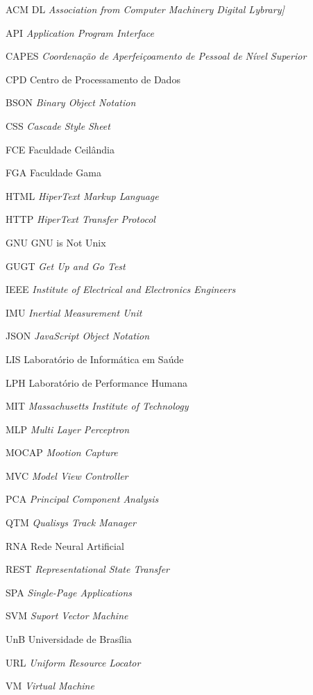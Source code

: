 \begin{siglas}
	\item[ACM DL] \emph{Association from Computer Machinery Digital Lybrary]}
	\item[API] \emph{Application Program Interface}
	\item[CAPES] \emph{Coordenação de Aperfeiçoamento de Pessoal de Nível Superior}
	\item[CPD] Centro de Processamento de Dados
	\item[BSON] \emph{Binary Object Notation} 
	\item[CSS] \emph{Cascade Style Sheet}
	\item[FCE] Faculdade Ceilândia 
	\item[FGA] Faculdade Gama
	\item[HTML] \emph{HiperText Markup Language}
	\item[HTTP] \emph{HiperText Transfer Protocol}
	\item[GNU] GNU is Not Unix
	\item[GUGT] \emph{Get Up and Go Test}
	\item[IEEE] \emph{Institute of Electrical and Electronics Engineers}
	\item[IMU] \emph{Inertial Measurement Unit}
	\item[JSON] \emph{JavaScript Object Notation} 
	\item[LIS] Laboratório de Informática em Saúde
	\item[LPH] Laboratório de Performance Humana
	\item[MIT]  \emph{Massachusetts Institute of Technology}
	\item[MLP] \emph{Multi Layer Perceptron}
	\item[MOCAP] \emph{Mootion Capture}
	\item[MVC] \emph{Model View Controller}
	\item[PCA] \emph{Principal Component Analysis}
	\item[QTM] \emph{Qualisys Track Manager}
	\item[RNA] Rede Neural Artificial
	\item[REST] \emph{Representational State Transfer}
	\item[SPA] \emph{Single-Page Applications}
	\item[SVM] \emph{Suport Vector Machine}
	\item[UnB] Universidade de Brasília
	\item[URL] \emph{Uniform Resource Locator}
	\item[VM] \emph{Virtual Machine}


\end{siglas}
